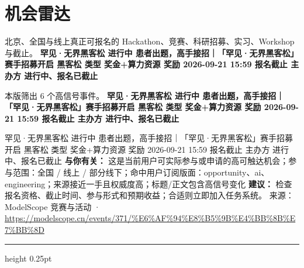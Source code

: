 \documentclass[10.5pt]{ctexart}
\begin{document}
\section*{机会雷达}
{\color{ormuted} 北京、全国与线上真正可报名的 Hackathon、竞赛、科研招募、实习、Workshop 与截止。}
\vspace{2mm}
{\LARGE\bfseries 罕见·无界黑客松 进行中 患者出题，高手接招｜「罕见·无界黑客松」赛手招募开启 黑客松 类型 奖金+算力资源 奖励 2026-09-21 15:59 报名截止 主办方 进行中、报名已截止}\par
\vspace{1mm}
{\color{ormuted} 本版筛出 6 个高信号事件。}
\vspace{3mm}
{\Large\bfseries 罕见·无界黑客松 进行中 患者出题，高手接招｜「罕见·无界黑客松」赛手招募开启 黑客松 类型 奖金+算力资源 奖励 2026-09-21 15:59 报名截止 主办方 进行中、报名已截止}\par
罕见·无界黑客松 进行中 患者出题，高手接招｜「罕见·无界黑客松」赛手招募开启 黑客松 类型 奖金+算力资源 奖励 2026-09-21 15:59 报名截止 主办方 进行中、报名已截止
\textbf{与你有关：} 这是当前用户可实际参与或申请的高可触达机会；参与范围：全国 / 线上 / 部分线下；命中用户订阅版面：opportunity、ai、engineering；来源接近一手且权威度高；标题/正文包含高信号变化
\textbf{建议：} 检查报名资格、截止时间、参与形式和预期收益；合适则立即加入任务系统。
{\footnotesize\color{ormuted} 来源：ModelScope 竞赛与活动 · \url{https://modelscope.cn/events/371/%E6%AF%94%E8%B5%9B%E4%BB%8B%E7%BB%8D}}
\vspace{4mm}
\hrule height 0.25pt
\vspace{3mm}
\end{document}
